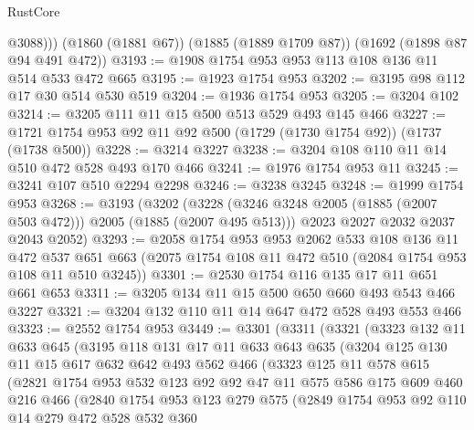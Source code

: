 \begin{lexlean}{RustCore}
\begin{coremodule}
          @3088)))
    (@1860 (@1881 @67))
    (@1885 (@1889 @1709 @87))
    (@1692 (@1898 @87 @94 @491 @472))
@3193 := @1908 @1754 @953 @953 @113 @108 @136 @11 @514 @533 @472 @665
@3195 := @1923 @1754 @953
@3202 := @3195 @98 @112 @17 @30 @514 @530 @519
@3204 := @1936 @1754 @953
@3205 := @3204 @102
@3214 := @3205 @111 @11 @15 @500 @513 @529 @493 @145 @466
@3227 := @1721 @1754 @953 @92 @11 @92 @500 (@1729 (@1730 @1754 @92)) (@1737 (@1738 @500))
@3228 := @3214 @3227
@3238 := @3204 @108 @110 @11 @14 @510 @472 @528 @493 @170 @466
@3241 := @1976 @1754 @953 @11
@3245 := @3241 @107 @510 @2294 @2298
@3246 := @3238 @3245
@3248 := @1999 @1754 @953
@3268 := @3193
    (@3202
      (@3228 (@3246 @3248 @2005 (@1885 (@2007 @503 @472))) @2005 (@1885 (@2007 @495 @513)))
      @2023
      @2027
      @2032
      @2037
      @2043
      @2052)
@3293 := @2058
    @1754
    @953
    @953
    @2062
    @533
    @108
    @136
    @11
    @472
    @537
    @651
    @663
    (@2075 @1754 @108 @11 @472 @510 (@2084 @1754 @953 @108 @11 @510 @3245))
@3301 := @2530 @1754 @116 @135 @17 @11 @651 @661 @653
@3311 := @3205 @134 @11 @15 @500 @650 @660 @493 @543 @466 @3227
@3321 := @3204 @132 @110 @11 @14 @647 @472 @528 @493 @553 @466
@3323 := @2552 @1754 @953
@3449 := @3301
    (@3311
      (@3321
        (@3323
          @132
          @11
          @633
          @645
          (@3195
            @118
            @131
            @17
            @11
            @633
            @643
            @635
            (@3204
              @125
              @130
              @11
              @15
              @617
              @632
              @642
              @493
              @562
              @466
              (@3323
                @125
                @11
                @578
                @615
                (@2821
                  @1754
                  @953
                  @532
                  @123
                  @92
                  @92
                  @47
                  @11
                  @575
                  @586
                  @175
                  @609
                  @460
                  @216
                  @466
                  (@2840
                    @1754
                    @953
                    @123
                    @279
                    @575
                    (@2849
                      @1754
                      @953
                      @92
                      @110
                      @14
                      @279
                      @472
                      @528
                      @532
                      @360

\end{coremodule}
\end{lexlean}
